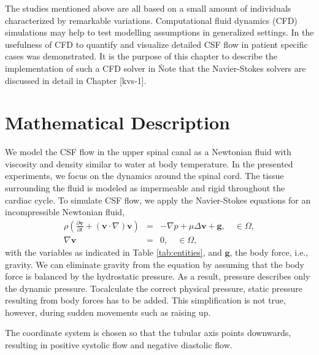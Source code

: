 The studies mentioned above are all based on a small amount of
individuals characterized by remarkable variations. Computational fluid dynamics (CFD) simulations
may help to test modelling assumptions in generalized
settings. In \cite{Gupta2009,Roldan2008} the
usefulness of CFD to quantify and visualize detailed CSF flow
in patient specific cases was demonstrated.
It is the purpose of this
chapter to describe the implementation of such a CFD solver in
\fenics\. Note that the Navier-Stokes solvers are discussed in
detail in Chapter [kvs-1].\\

\section{Mathematical Description}

We model the CSF flow in the upper spinal canal as a Newtonian fluid
 with viscosity and density similar to water
at body temperature. In the presented experiments, we focus on the
dynamics around the spinal cord. The tissue surrounding the fluid is
modeled as impermeable and rigid throughout the cardiac cycle. To
simulate CSF flow, we apply the Navier-Stokes 
equations for an incompressible Newtonian fluid,
\begin{eqnarray*}
\rho \left(\frac{\partial \mathbf{v}}{\partial t} + (\mathbf{v}\cdot\nabla) \mathbf{v}\right) &=& -\nabla p + \mu \Delta \mathbf{v} + \mathbf{g}, \quad \in \Omega, \\
\nabla \mathbf{v} &=& 0, \quad \in \Omega,
\end{eqnarray*}
with the variables as indicated in Table \ref{tab:entities}, and $\mathbf{g}$,
the body force, i.e., gravity. We can eliminate gravity from the
equation by assuming that the body force is balanced by the
hydrostatic pressure. As a result, pressure describes only the dynamic
pressure. Tocalculate the correct physical pressure, static
pressure resulting from body forces has to be added. This
simplification is not true, however, during sudden movements such as
raising up.

The coordinate system is chosen so that the tubular axis points downwards, resulting in positive systolic flow and negative diastolic flow.

